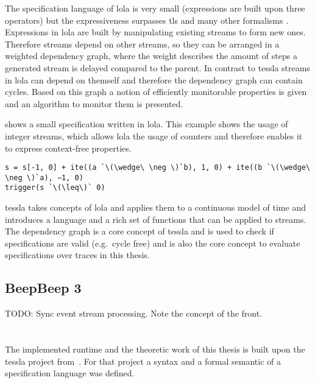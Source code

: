 The specification language of \gls{lola} is very small (expressions are built upon three operators) but the expressiveness surpasses \glspl{tl} and many other formalisms \citep{DAngelo2005}.
Expressions in \gls{lola} are built by manipulating existing streams to form new ones.
Therefore streams depend on other streams, so they can be arranged in a weighted dependency graph, where the weight describes the amount of steps a generated stream is delayed compared to the parent.
In contrast to \gls{tessla} streams in \gls{lola} can depend on themself and therefore the dependency graph can contain cycles.
Based on this graph a notion of efficiently monitorable properties is given and an algorithm to monitor them is presented.

 shows a small specification written in \gls{lola}.
This example shows the usage of integer streams, which allows \gls{lola} the usage of counters and therefore enables it to express context-free properties.

\begin{lstlisting}[escapeinside=``,numbers=none,float,label=listing:lola_spec, caption={[A specification written in \gls{lola}]A \gls{lola} specification describing the property that the number of \emph{a}\'s in a stream shall never be less then the number of \emph{b}\'s}]
s = s[-1, 0] + ite((a `\(\wedge\ \neg \)`b), 1, 0) + ite((b `\(\wedge\ \neg \)`a), −1, 0)
trigger(s `\(\leq\)` 0)
\end{lstlisting}


\gls{tessla} takes concepts of \gls{lola} and applies them to a continuous model of time and introduces a language and a rich set of functions that can be applied to streams.
The dependency graph is a core concept of \gls{tessla} and is used to check if specifications are valid (e.g.\ cycle free) and is also the core concept to evaluate specifications over traces in this thesis.

\subsection{BeepBeep 3}
\label{sec:related:stream_based:beepbeep}
TODO: Sync event stream processing.
Note the concept of the front.

\section{}
\label{sec:related:tessla}

The implemented runtime and the theoretic work of this thesis is built upon the \gls{tessla} project from~\cite{Decker2016}.
For that project a syntax and a formal semantic of a specification language was defined.

